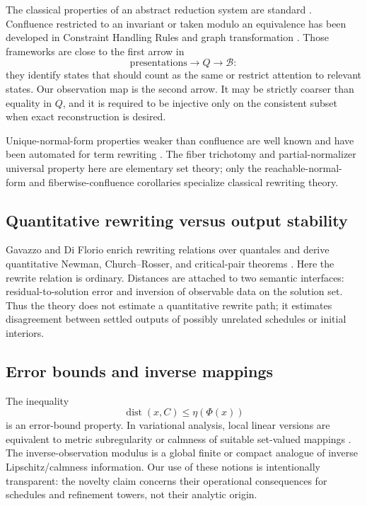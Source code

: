 \documentclass[11pt]{article}
\theoremstyle{definition}
\theoremstyle{remark}
\numberwithin{equation}{section}
\newcommand{\dist}{\operatorname{dist}}
\newcommand{\cB}{\mathcal B}
\begin{document}
The classical properties of an abstract reduction system are standard \citep{Huet1980,BaaderNipkow1998,Terese2003}.  Confluence restricted to an invariant or taken modulo an equivalence has been developed in Constraint Handling Rules and graph transformation \citep{ChristiansenKirkeby2016,GallFruehwirth2018,CampbellPlump2021}.  Those frameworks are close to the first arrow in
\[
 \text{presentations}\longrightarrow Q\longrightarrow\cB:
\]
they identify states that should count as the same or restrict attention to relevant states.  Our observation map is the second arrow.  It may be strictly coarser than equality in $Q$, and it is required to be injective only on the consistent subset when exact reconstruction is desired.

Unique-normal-form properties weaker than confluence are well known and have
been automated for term rewriting \citep{AotoToyama2018}.  The fiber
trichotomy and partial-normalizer universal property here are elementary set
theory; only the reachable-normal-form and fiberwise-confluence corollaries
specialize classical rewriting theory.

\subsection{Quantitative rewriting versus output stability}

Gavazzo and Di Florio enrich rewriting relations over quantales and derive quantitative Newman, Church--Rosser, and critical-pair theorems \citep{GavazzoDiFlorio2022}.  Here the rewrite relation is ordinary.  Distances are attached to two semantic interfaces: residual-to-solution error and inversion of observable data on the solution set.  Thus the theory does not estimate a quantitative rewrite path; it estimates disagreement between settled outputs of possibly unrelated schedules or initial interiors.

\subsection{Error bounds and inverse mappings}

The inequality
\[
 \dist(x,C)\le \eta(\Phi(x))
\]
is an error-bound property.  In variational analysis, local linear versions are equivalent to metric subregularity or calmness of suitable set-valued mappings \citep{Kruger2015,CibulkaDontchevKruger2018,DontchevRockafellar2014}.  The inverse-observation modulus is a global finite or compact analogue of inverse Lipschitz/calmness information.  Our use of these notions is intentionally transparent: the novelty claim concerns their operational consequences for schedules and refinement towers, not their analytic origin.
\end{document}

